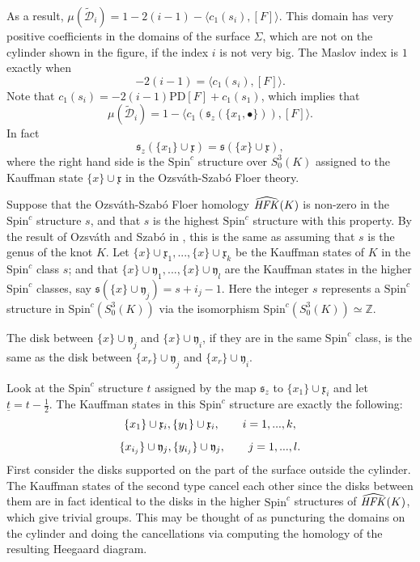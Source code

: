 \documentclass{gtart_h}
\theoremstyle{definition}
\newcommand{\ut}{\underline{t}}
\newcommand{\spinc}{\mathfrak s}
\newcommand\HFK{\text{\it HFK\/}}
\newcommand{\Z}{\mathbb{Z}}
\newcommand{\SpinC}{{\mathrm{Spin}}^c}
\begin{document}
As a result, $\mu(\tilde{\mathcal{D}}_i)=1-2(i-1)-\langle c_1(s_i),[F] \rangle$.
This domain has
very positive coefficients in the domains of the surface $\Sigma$, which are not on the
cylinder shown in the figure, if the index $i$ is not very big. The Maslov index
is $1$ exactly when
\begin{displaymath}
-2(i-1)=\langle c_1(s_i),[F]\rangle .
\end{displaymath}
Note that
$c_1(s_i)=-2(i-1)\text{PD}[ F]+c_1(s_1)$, which implies that
\begin{displaymath}
\mu(\tilde{\mathcal{D}}_i)=1-\langle c_1(\spinc_z(\{x_1,\bullet\})),[F]\rangle .
\end{displaymath}
In fact
\begin{equation}
\spinc_z(\{x_1\}\cup \mathfrak{x})=\spinc(\{x\}\cup\mathfrak{x}),
\end{equation}
where the right hand side is the $\SpinC$ structure over $S^3_0(K)$ assigned
to the Kauffman state $\{x\}\cup\mathfrak{x}$ in the Ozsv\'ath-Szab\'o
Floer theory.

Suppose that the Ozsv\'ath-Szab\'o Floer homology $\widehat{\HFK}(K)$ is non-zero in
the $\SpinC$ structure $s$, and that $s$ is the highest $\SpinC$ structure
with this property.
By the result of Ozsv\'ath and Szab\'o in \cite{OS-genus}, this is the same as assuming that
$s$ is the genus of the knot $K$.
Let $\{x\}\cup\mathfrak{x}_1,...,\{x\}\cup\mathfrak{x}_k$
be the Kauffman states of $K$ in the $\SpinC$ class $s$; and that
$\{x\}\cup\mathfrak{y}_1,...,\{x\}\cup\mathfrak{y}_l$ are the Kauffman states
in the higher $\SpinC$ classes, say $\spinc(\{x\}\cup\mathfrak{y}_j)=s+i_j-1$.
Here the integer $s$ represents a $\SpinC$ structure in $\SpinC(S^3_0(K))$ via
the isomorphism $\SpinC(S^3_0(K))\simeq \Z$. 

The disk between $\{x\}\cup\mathfrak{y}_j$ and $\{x\}\cup\mathfrak{y}_i$, if they
are in the same $\SpinC$ class, is the same as the disk between
$\{x_r\}\cup\mathfrak{y}_j$ and $\{x_r\}\cup\mathfrak{y}_i$.

Look at the $\SpinC$ structure $t$ assigned by the map $\spinc_z$ to
$\{x_1\}\cup\mathfrak{x}_i$ and let $\ut=t-\tfrac{1}{2}$. The Kauffman
states in this $\SpinC$ structure are exactly the following:
\begin{displaymath}
\begin{CD}
\{x_1\}\cup\mathfrak{x}_i,\{y_1\}\cup\mathfrak{x}_i,\ \ \ \ \ \ i=1,...,k,\\
\{x_{i_j}\}\cup\mathfrak{y}_j,\{y_{i_j}\}\cup\mathfrak{y}_j,\ \ \ \ \ \ j=1,...,l.\\
\end{CD}
\end{displaymath}
First consider the disks supported on the part of the surface outside the cylinder.
The Kauffman states of the second type cancel each other since the disks
between them are in fact identical to the disks in the higher $\SpinC$ structures
of $\widehat{\HFK}(K)$, which give trivial groups. This may be thought of as puncturing
the domains on the cylinder and doing the cancellations via computing the homology
of the resulting Heegaard diagram. 
\end{document}
